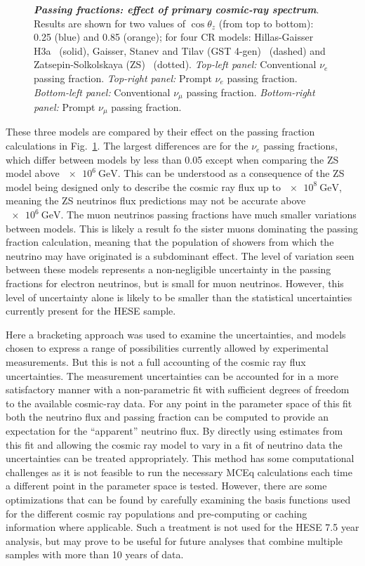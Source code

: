 \begin{figure}[h!]
{	}
	\caption{\textbf{\textit{Passing fractions: effect of primary cosmic-ray spectrum}}. Results are shown for two values of $\cos\theta_z$ (from top to bottom): 0.25 (blue) and 0.85 (orange); for four CR models: Hillas-Gaisser H3a~\cite{Gaisser:2011cc} (solid), Gaisser, Stanev and Tilav (GST 4-gen)~\cite{Gaisser:2013bla} (dashed) and Zatsepin-Solkolskaya (ZS)~\cite{Zatsepin:2006ci} (dotted).
		\textit{Top-left panel:} Conventional $\nu_e$ passing fraction. \textit{Top-right panel:} Prompt $\nu_e$ passing fraction. \textit{Bottom-left panel:} Conventional $\nu_\mu$ passing fraction. \textit{Bottom-right panel:} Prompt $\nu_\mu$ passing fraction.}
	\label{fig:nue-cr-model-effect} \vspace{1.5cm}
\end{figure}

These three models are compared by their effect on the passing fraction calculations in Fig.~\ref{fig:nue-cr-model-effect}.
The largest differences are for the $\nu_e$ passing fractions, which differ between models by less than 0.05 except when comparing the ZS model above $\SI{e6}\GeV$.
This can be understood as a consequence of the ZS model being designed only to describe the cosmic ray flux up to $\SI{e8}\GeV$, meaning the ZS neutrinos flux predictions may not be accurate above $\SI{e6}\GeV$.
The muon neutrinos passing fractions have much smaller variations between models.
This is likely a result fo the sister muons dominating the passing fraction calculation, meaning that the population of showers from which the neutrino may have originated is a subdominant effect.
The level of variation seen between these models represents a non-negligible uncertainty in the passing fractions for electron neutrinos, but is small for muon neutrinos.
However, this level of uncertainty alone is likely to be smaller than the statistical uncertainties currently present for the HESE sample.

Here a bracketing approach was used to examine the uncertainties, and models chosen to express a range of possibilities currently allowed by experimental measurements.
But this is not a full accounting of the cosmic ray flux uncertainties.
The measurement uncertainties can be accounted for in a more satisfactory manner with a non-parametric fit with sufficient degrees of freedom to the available cosmic-ray data.
For any point in the parameter space of this fit both the neutrino flux and passing fraction can be computed to provide an expectation for the ``apparent'' neutrino flux.
By directly using estimates from this fit and allowing the cosmic ray model to vary in a fit of neutrino data the uncertainties can be treated appropriately.
This method has some computational challenges as it is not feasible to run the necessary MCEq calculations each time a different point in the parameter space is tested.
However, there are some optimizations that can be found by carefully examining the basis functions used for the different cosmic ray populations and pre-computing or caching information where applicable.
Such a treatment is not used for the HESE 7.5 year analysis, but may prove to be useful for future analyses that combine multiple samples with more than 10 years of data.

